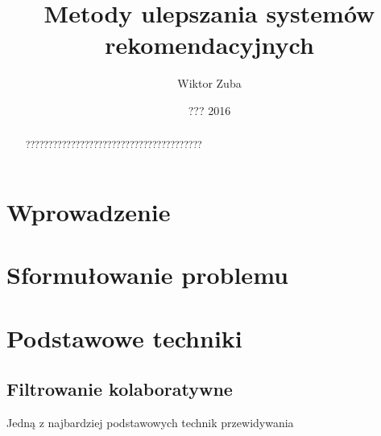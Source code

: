 \documentclass{pracamgr}
\author{Wiktor Zuba}
\title{Metody ulepszania systemów rekomendacyjnych}
\date{??? 2016}
\begin{document}
\maketitle

\begin{abstract}
???????????????????????????????????????
\end{abstract}


\tableofcontents

\chapter*{Wprowadzenie}


 \chapter{Sformułowanie problemu}
 


 \chapter{Podstawowe techniki}
  \section{Filtrowanie kolaboratywne}
  Jedną z najbardziej podstawowych technik przewidywania 
 

\begin{thebibliography}{99}%






\end{thebibliography}
\end{document}

